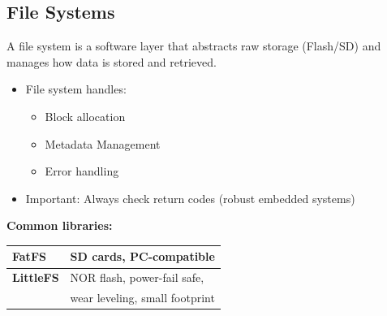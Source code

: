 \subsection{File Systems}
  A file system is a software layer that abstracts raw storage (Flash/SD) and manages how data is stored and retrieved.

  \begin{minipage}[t]{0.48\linewidth}
    \begin{itemize}
      \item File system handles:
        \begin{itemize}
          \item Block allocation
          \item Metadata Management
          \item Error handling
        \end{itemize}
      \item Important: Always check return codes (robust embedded systems)
    \end{itemize}
  \end{minipage}\hfill
  \begin{minipage}[t]{0.48\linewidth}
    \textbf{Common libraries:}

    \vspace{0.2cm}
    \begin{tabular}{ll}
      \toprule
      \textbf{FatFS}    & SD cards, PC-compatible \\\midrule
      \textbf{LittleFS} & NOR flash, power-fail safe,\\
                        & wear leveling, small footprint\\ \bottomrule
    \end{tabular}
  \end{minipage}

